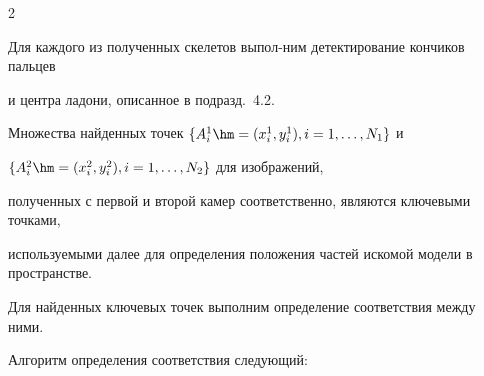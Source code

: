 \begin{multicols}{2}
\begin{figure}[b]
\end{figure}





Для каждого из полученных скелетов выпол-\linebreak ним детектирование кончиков пальцев 


и центра ла\-дони, описанное в подразд.~4.2. 


Множества найден\-ных точек $\{A^1_i\hm=(x^1_i, y^1_i), i=1, \ldots , N_1\}$ и 


$\{A^2_i\hm=(x^2_i, y^2_i), i=1, \ldots , N_2\}$ для изображений,


полученных с первой и второй камер соответственно, являются ключевыми точками, 


используемыми далее для определения положения частей искомой модели в пространстве.








Для найденных ключевых точек выполним определение соответствия между ними. 


Алгоритм определения соответствия следующий:


\end{multicols}
